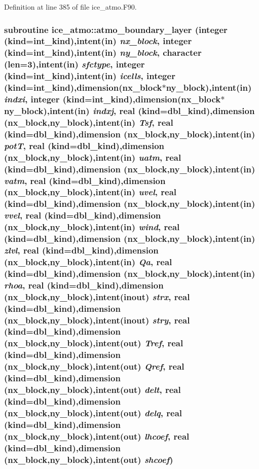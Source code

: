 Definition at line 385 of file ice\_\-atmo.F90.\hypertarget{namespaceice__atmo_a0064e438c4aa02621fad02322d62875a}{
\subsubsection[{atmo\_\-boundary\_\-layer}]{\setlength{\rightskip}{0pt plus 5cm}subroutine ice\_\-atmo::atmo\_\-boundary\_\-layer (integer (kind=int\_\-kind),intent(in) {\em nx\_\-block}, \/  integer (kind=int\_\-kind),intent(in) {\em ny\_\-block}, \/  character (len=3),intent(in) {\em sfctype}, \/  integer (kind=int\_\-kind),intent(in) {\em icells}, \/  integer (kind=int\_\-kind),dimension(nx\_\-block$\ast$ny\_\-block),intent(in) {\em indxi}, \/  integer (kind=int\_\-kind),dimension(nx\_\-block$\ast$ny\_\-block),intent(in) {\em indxj}, \/  real (kind=dbl\_\-kind),dimension (nx\_\-block,ny\_\-block),intent(in) {\em Tsf}, \/  real (kind=dbl\_\-kind),dimension (nx\_\-block,ny\_\-block),intent(in) {\em potT}, \/  real (kind=dbl\_\-kind),dimension (nx\_\-block,ny\_\-block),intent(in) {\em uatm}, \/  real (kind=dbl\_\-kind),dimension (nx\_\-block,ny\_\-block),intent(in) {\em vatm}, \/  real (kind=dbl\_\-kind),dimension (nx\_\-block,ny\_\-block),intent(in) {\em uvel}, \/  real (kind=dbl\_\-kind),dimension (nx\_\-block,ny\_\-block),intent(in) {\em vvel}, \/  real (kind=dbl\_\-kind),dimension (nx\_\-block,ny\_\-block),intent(in) {\em wind}, \/  real (kind=dbl\_\-kind),dimension (nx\_\-block,ny\_\-block),intent(in) {\em zlvl}, \/  real (kind=dbl\_\-kind),dimension (nx\_\-block,ny\_\-block),intent(in) {\em Qa}, \/  real (kind=dbl\_\-kind),dimension (nx\_\-block,ny\_\-block),intent(in) {\em rhoa}, \/  real (kind=dbl\_\-kind),dimension (nx\_\-block,ny\_\-block),intent(inout) {\em strx}, \/  real (kind=dbl\_\-kind),dimension (nx\_\-block,ny\_\-block),intent(inout) {\em stry}, \/  real (kind=dbl\_\-kind),dimension (nx\_\-block,ny\_\-block),intent(out) {\em Tref}, \/  real (kind=dbl\_\-kind),dimension (nx\_\-block,ny\_\-block),intent(out) {\em Qref}, \/  real (kind=dbl\_\-kind),dimension (nx\_\-block,ny\_\-block),intent(out) {\em delt}, \/  real (kind=dbl\_\-kind),dimension (nx\_\-block,ny\_\-block),intent(out) {\em delq}, \/  real (kind=dbl\_\-kind),dimension (nx\_\-block,ny\_\-block),intent(out) {\em lhcoef}, \/  real (kind=dbl\_\-kind),dimension (nx\_\-block,ny\_\-block),intent(out) {\em shcoef})}}
\label{namespaceice__atmo_a0064e438c4aa02621fad02322d62875a}


